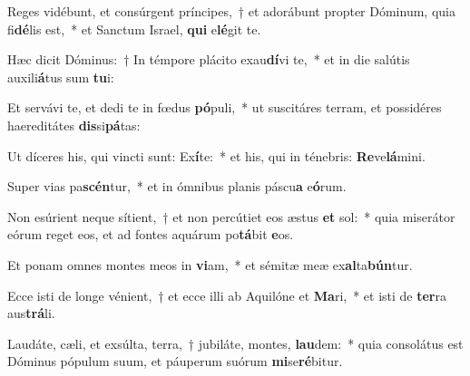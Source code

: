 \item Reges vidébunt, et consúrgent príncipes,~† et adorábunt propter Dóminum, quia fi\textbf{dé}lis est,~* et Sanctum Israel, \textbf{qui} e\textbf{lé}git te.
\item Hæc dicit Dóminus:~† In témpore plácito exau\textbf{dí}vi te,~* et in die salútis auxili\textbf{á}tus sum \textbf{tu}i:
\item Et servávi te, et dedi te in fœdus \textbf{pó}puli,~* ut suscitáres terram, et possidéres haereditátes \textbf{dis}si\textbf{pá}tas:
\item Ut díceres his, qui vincti sunt: Ex\textbf{í}te:~* et his, qui in ténebris: \textbf{Re}ve\textbf{lá}mini.
\item Super vias pa\textbf{scén}tur,~* et in ómnibus planis páscu\textbf{a} e\textbf{ó}rum.
\item Non esúrient neque sítient,~† et non percútiet eos æstus \textbf{et} sol:~* quia miserátor eórum reget eos, et ad fontes aquárum po\textbf{tá}bit \textbf{e}os.
\item Et ponam omnes montes meos in \textbf{vi}am,~* et sémitæ meæ ex\textbf{al}ta\textbf{bún}tur.
\item Ecce isti de longe vénient,~† et ecce illi ab Aquilóne et \textbf{Ma}ri,~* et isti de \textbf{ter}ra aus\textbf{trá}li.
\item Laudáte, cæli, et exsúlta, terra,~† jubiláte, montes, \textbf{lau}dem:~* quia consolátus est Dóminus pópulum suum, et páuperum suórum \textbf{mi}se\textbf{ré}bitur.
